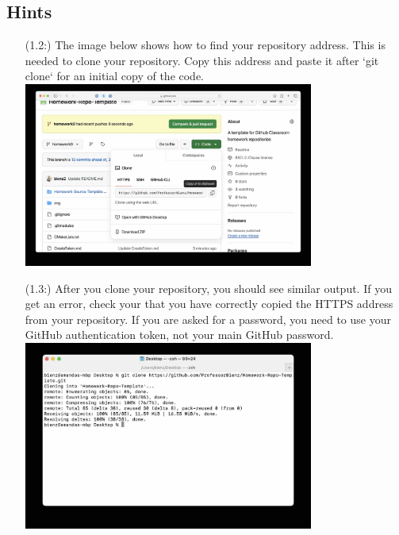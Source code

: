 \documentclass{article} %
\begin{document}
\subsection*{Hints}
\begin{enumerate}
    \item [(1.2:)] The image below shows how to find your repository address.  This is needed to clone your repository.  Copy this address and paste it after `git clone` for an initial copy of the code.\\
    \includegraphics[width=0.75\textwidth]{figs/0_repo_addr.jpg}

    \item [(1.3:)] After you clone your repository, you should see similar output.  If you get an error, check your that you have correctly copied the HTTPS address from your repository.  If you are asked for a password, you need to use your GitHub authentication token, not your main GitHub password.\\  \includegraphics[width=0.75\textwidth]{figs/1_clone.jpg}


\end{enumerate}
\end{document}
